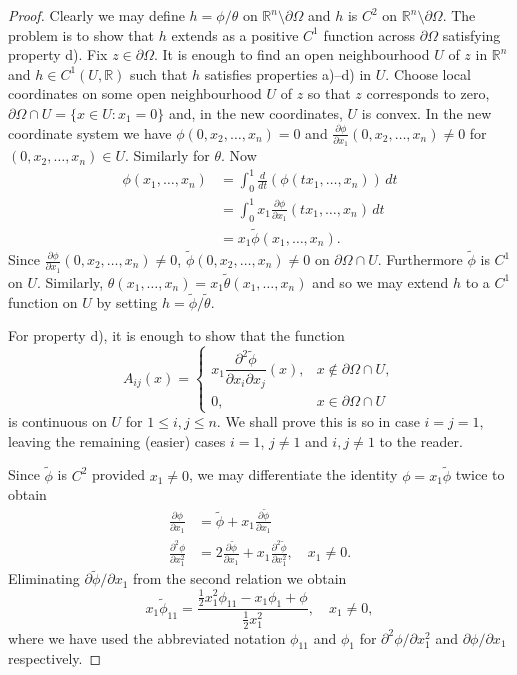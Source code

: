 \begin{proof}
Clearly we may define $h=\phi/\theta$ on $\mathbb R^n\setminus\partial\Omega$ and $h$ is $C^2$ on $\mathbb R^n\setminus\partial\Omega$. The problem is to show that $h$ extends as a positive $C^1$ function across $\partial\Omega$ satisfying property d). Fix $z\in\partial\Omega$. It is enough to find an open neighbourhood $U$ of $z$ in $\mathbb R^n$ and $h\in C^1(U,\mathbb R)$ such that $h$ satisfies properties a)--d) in $U$. Choose local coordinates on some open neighbourhood $U$ of $z$ so that $z$ corresponds to zero, $\partial\Omega\cap U=\{x\in U:x_1=0\}$ and, in the new coordinates, $U$ is convex. In the new coordinate system we have $\phi(0,x_2,\ldots,x_n)=0$ and $\frac{\partial\phi}{\partial x_1}(0,x_2,\ldots,x_n)\neq0$ for $(0,x_2,\ldots,x_n)\in U$. Similarly for $\theta$. Now
\begin{align*}
\phi(x_1,\ldots,x_n)&=\int_0^1\frac{d}{dt}(\phi(tx_1,\ldots,x_n))\,dt\\
&=\int_0^1x_1\frac{\partial\phi}{\partial x_1}(tx_1,\ldots,x_n)\,dt\\
&=x_1\widetilde\phi(x_1,\ldots,x_n).
\end{align*}
Since $\frac{\partial\phi}{\partial x_1}(0,x_2,\ldots,x_n)\neq0$, $\widetilde\phi(0,x_2,\ldots,x_n)\neq0$ on $\partial\Omega\cap U$. Furthermore $\widetilde\phi$ is $C^1$ on $U$. Similarly, $\theta(x_1,\ldots,x_n)=x_1\widetilde\theta(x_1,\ldots,x_n)$ and so we may extend $h$ to a $C^1$ function on $U$ by setting $h=\widetilde\phi/\widetilde\theta$.

For property d), it is enough to show that the function
\[A_{ij}(x)=\begin{cases}x_1\dfrac{\partial^2\widetilde\phi}{\partial x_i\partial x_j}(x),&x\notin\partial\Omega\cap U,\\0,&x\in\partial\Omega\cap U\end{cases}\]
is continuous on $U$ for $1\leq i,j\leq n$. We shall prove this is so in case $i=j=1$, leaving the remaining (easier) cases $i=1$, $j\neq1$ and $i,j\neq1$ to the reader.

Since $\widetilde\phi$ is $C^2$ provided $x_1\neq0$, we may differentiate the identity $\phi=x_1\widetilde\phi$ twice to obtain
\begin{align*}
\frac{\partial\phi}{\partial x_1}&=\widetilde\phi+x_1\frac{\partial\widetilde\phi}{\partial x_1}\\
\frac{\partial^2\phi}{\partial x_1^2}&=2\frac{\partial\widetilde\phi}{\partial x_1}+x_1\frac{\partial^2\widetilde\phi}{\partial x_1^2},\quad x_1\neq0.
\end{align*}
Eliminating $\partial\widetilde\phi/\partial x_1$ from the second relation we obtain
\[x_1\widetilde\phi_{11}=\frac{\tfrac12 x_1^2\phi_{11}-x_1\phi_1+\phi}{\tfrac12 x_1^2},\quad x_1\neq0,\tag{*}\label{eq:2:star:2}\]
where we have used the abbreviated notation $\phi_{11}$ and $\phi_1$ for $\partial^2\phi/\partial x_1^2$ and $\partial\phi/\partial x_1$ respectively.


\end{proof}
